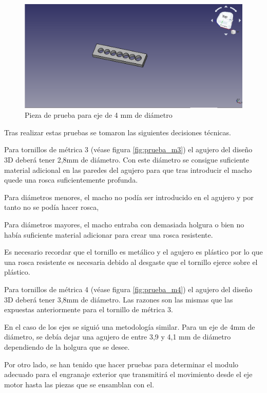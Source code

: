 \begin{figure}[H]
    \centering
    \includegraphics[width=.7\linewidth]{pictures/PruebaEje.png}
    \caption{Pieza de prueba para eje de 4 mm de diámetro}
    \label{fig:prueba_eje}
\end{figure}

Tras realizar estas pruebas se tomaron las siguientes decisiones técnicas.

Para tornillos de métrica 3 (véase figura \ref{fig:prueba_m3}) el agujero del diseño 3D deberá tener 2,8mm de diámetro. Con este diámetro se consigue suficiente material adicional en las paredes del agujero para que tras introducir el macho quede una rosca suficientemente profunda.

Para diámetros menores, el macho no podía ser introducido en el agujero y por tanto no se podía hacer rosca,

Para diámetros mayores, el macho entraba con demasiada holgura o bien no había suficiente material adicionar para crear una rosca resistente.

Es necesario recordar que el tornillo es metálico y el agujero es plástico por lo que una rosca resistente es necesaria debido al desgaste que el tornillo ejerce sobre el plástico.

Para tornillos de métrica 4 (véase figura \ref{fig:prueba_m4}) el agujero del diseño 3D deberá tener 3,8mm de diámetro. Las razones son las mismas que las expuestas anteriormente para el tornillo de métrica 3.

En el caso de los ejes se siguió una metodología similar.
Para un eje de 4mm de diámetro, se debía dejar una agujero de entre 3,9 y 4,1 mm de diámetro dependiendo de la holgura que se desee.

Por otro lado, se han tenido que hacer pruebas para determinar el modulo adecuado para el engranaje exterior que transmitirá el movimiento desde el eje motor hasta las piezas que se ensamblan con el.

